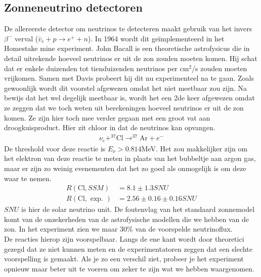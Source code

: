 \documentclass[../main.tex]{subfiles}
\begin{document}
\subsection{Zonneneutrino detectoren}%
\label{sub:zonne_neutrino_detectoren}

De allereerste detector om neutrinos te detecteren maakt gebruik van het invers $\beta^-$ verval ($\bar{v}_{e}+p\rightarrow e^{+}+n$). In 1964 wordt dit geïmplementeerd in het Homestake mine experiment. John Bacall is een theoretische astrofysicus die in detail uitrekende hoeveel neutrinos er uit de zon zouden moeten komen. Hij schat dat er enkele duizenden tot tienduizenden neutrinos per cm$^2$/s zouden moeten vrijkomen. Samen met Davis probeert hij dit nu experimenteel na te gaan. Zoals gewoonlijk wordt dit voorstel afgewezen omdat het niet meetbaar zou zijn. Na bewijs dat het wel degelijk meetbaar is, wordt het een 2de keer afgewezen omdat ze zeggen dat we toch weten uit berekeningen hoeveel neutrinos er uit de zon komen. Ze zijn hier toch mee verder gegaan met een groot vat aan droogkuisproduct. Hier zit chloor in dat de neutrinos kan opvangen.
\begin{equation}
    \begin{aligned}
        \label{eq:cl_neutrino_capture}
        \nu_{e}+^{37} \mathrm{Cl} \rightarrow^{37} \mathrm{Ar}+e^{-}
    \end{aligned}
\end{equation}
De threshold voor deze reactie is $E_\nu > 0.814$MeV. Het zou makkelijker zijn om het elektron van deze reactie te meten in plaats van het bubbeltje aan argon gas, maar er zijn zo weinig evenementen dat het zo goed als onmogelijk is om deze waar te nemen.
\begin{equation}
    \begin{aligned}
        \label{eq:homestake_mine_exp}
        R(\mathrm{Cl}, S S M) &=8.1 \pm 1.3 S N U \\
        R(\mathrm{Cl}, \text { exp. }) &=2.56 \pm 0.16 \pm 0.16 S N U
    \end{aligned}
\end{equation}
$SNU$ is hier de solar neutrino unit. De foutenvlag van het standaard zonnemodel komt van de onzekerheden van de astrofysische modellen die we hebben van de zon. In het experiment zien we maar $30\%$ van de voorspelde neutrinoflux.\\
De reacties hierop zijn voorspelbaar. Langs de ene kant wordt door theoretici gezegd dat ze niet kunnen meten en de experimentatoren zeggen dat een slechte voorspelling is gemaakt. Als je zo een verschil ziet, probeer je het experiment opnieuw maar beter uit te voeren om zeker te zijn wat we hebben waargenomen.\\
\end{document}
